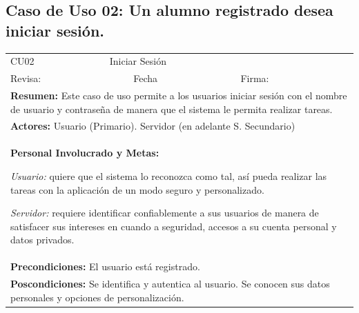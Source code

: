 
\subsection{Caso de Uso 02: Un alumno registrado desea iniciar sesión.}

\begin{longtable}{|l|p{5.5cm}|l|p{2cm}|l|p{1.9cm}|} \hline
    \cellcolor{grisOscuro} CU02 & \multicolumn{4}{|l|}{  \cellcolor{grisOscuro} Iniciar Sesión} &  \cellcolor{grisClaro}\multirow{2}{1cm}{} \\ \cline{1-5}
    \cellcolor{grisOscuro} Revisa: &  \cellcolor{grisClaro} &  \cellcolor{grisOscuro} Fecha &  \cellcolor{grisClaro} &  \cellcolor{grisOscuro} Firma: & \cellcolor{grisClaro} \\ \hline
    \multicolumn{6}{|p{15cm}|}{ \textbf{Resumen: } Este caso de uso permite a los usuarios iniciar sesión con el nombre de usuario y contraseña de manera que el sistema le permita realizar tareas.

    } \\ \hline

    \multicolumn{6}{|p{15cm}|}{ \textbf{Actores: } Usuario (Primario). Servidor (en adelante S. Secundario)

    } \\ \hline

    \multicolumn{6}{|p{15cm}|}{ \textbf{Personal Involucrado y Metas: }

    \emph{Usuario:} quiere que el sistema lo reconozca como tal, así pueda realizar las tareas con la aplicación de un modo seguro y personalizado.

    \emph{Servidor:} requiere identificar confiablemente a sus usuarios de manera de satisfacer sus intereses en cuando a seguridad, accesos a su cuenta personal y datos privados.

    } \\ \hline

    \multicolumn{6}{|p{15cm}|}{ \textbf{Precondiciones: } El usuario está registrado.

    } \\ \hline

    \multicolumn{6}{|p{15cm}|}{ \textbf{Poscondiciones: } Se identifica y autentica al usuario. Se conocen sus datos personales y opciones de personalización.

}
\end{longtable}
